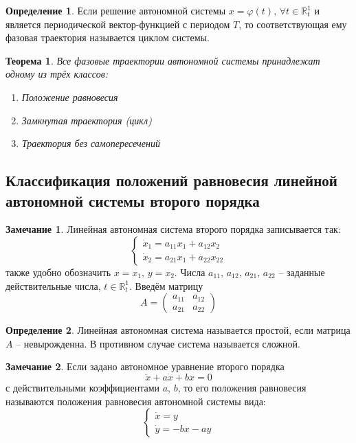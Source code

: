 \documentclass[a4paper,12pt]{article}
\renewcommand{\phi}{\ensuremath{\varphi}}
\theoremstyle{plain}
\newtheorem{theorem}{Теорема}[section]
\theoremstyle{definition}
\newtheorem{definition}{Определение}[section]
\newtheorem*{note}{Замечание}
\theoremstyle{remark}
\begin{document}
\begin{definition}
	Если решение автономной системы $x = \phi(t),\, \forall t \in \mathbb{R}_t^1$ и является периодической вектор-функцией с периодом $T$, то соответствующая ему фазовая траектория называется циклом системы.
\end{definition}

\begin{theorem}
	Все фазовые траектории автономной системы принадлежат одному из трёх классов:
	\begin{enumerate}
		\item Положение равновесия
		\item Замкнутая траектория (цикл)
		\item Траектория без самопересечений
	\end{enumerate}
\end{theorem}

\subsection{Классификация положений равновесия линейной автономной системы второго порядка}
\begin{note}
	Линейная автономная система второго порядка записывается так:
	\[\begin{cases}
			\dot{x}_1 = a_{11}x_1 + a_{12}x_2 \\
			\dot{x}_2 = a_{21}x_1 + a_{22}x_22
		\end{cases}\]
	также удобно обозначить $x = x_1,\, y = x_2$. Числа $a_{11},\, a_{12},\, a_{21},\, a_{22}$ -- заданные действительные числа, $t \in \mathbb{R}_t^1$. Введём матрицу
	\[A = \begin{pmatrix}
			a_{11} & a_{12} \\
			a_{21} & a_{22}
		\end{pmatrix}\]
\end{note}

\begin{definition}
	Линейная автономная система называется простой, если матрица $A$ -- невырожденна. В противном случае система называется сложной.
\end{definition}

\begin{note}
	Если задано автономное уравнение второго порядка
	\[\ddot{x} + a\dot{x} + bx = 0\]
	с действительными коэффициентами $a,\,b$, то его положения равновесия называются положения равновесия автономной системы вида:
	\[\begin{cases}
			\dot{x} = y \\
			\dot{y} = -bx - ay
		\end{cases}\]
\end{note}
\end{document}
